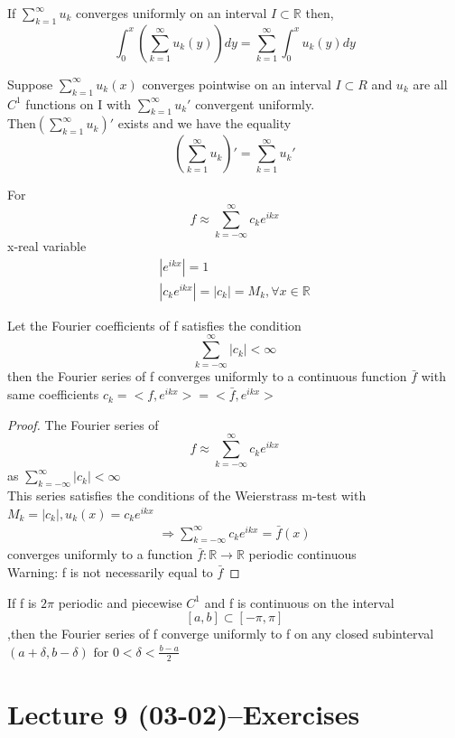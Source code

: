 \begin{proposition}[]{}
If $ \sum_{k=1}^{\infty}u_k $ converges uniformly on an interval $ I\subset \mathbb{R} $ then,$$
    \int_{0}^{x}(\sum_{k=1}^{\infty}u_k(y))dy=\sum_{k=1}^{\infty}\int_{0}^{x}u_k(y)dy
$$ 
\end{proposition}
\begin{proposition}[]{}
Suppose $\sum_{k=1}^{\infty}u_k(x)$ converges pointwise on an interval $I\subset R  $ and $ u_k $ are all $ C^1 $ functions on I with $ \sum_{k=1}^{\infty}u_k' $ convergent uniformly.
\\Then$ (\sum_{k=1}^{\infty}u_k)' $ exists and we have the equality $$
(\sum_{k=1}^{\infty}u_k)'=\sum_{k=1}^{\infty}u_k'
$$     
\end{proposition}
For$$
f \approx \sum_{k=-\infty}^{\infty}c_ke^{ikx}
$$ 
x-real variable
\begin{align*}{}{}
|e^{ikx}|=1\\
|c_ke^{ikx}|=|c_k| =M_k,\forall x\in\mathbb{R}
\end{align*}
\begin{theorem}[]{}
Let the Fourier coefficients of f satisfies the condition$$
  \sum_{k=-\infty}^{\infty}|c_k|<\infty
$$ then the Fourier series of f converges uniformly to a continuous function $ \bar{f} $ with same coefficients $ c_k=<f,e^{ikx}>=<\bar{f},e^{ikx}> $  
\end{theorem}
\begin{proof}
    The Fourier series of $$
        f\approx\sum_{k=-\infty}^{\infty}c_ke^{ikx}
    $$ as $\sum_{k=-\infty}^{\infty}|c_k|<\infty$
    \\This series satisfies the conditions of the Weierstrass m-test with $ M_k=|c_k| ,u_k(x)=c_ke^{ikx}$
    \begin{align*}{}{}
    \Rightarrow \sum_{k=-\infty}^{\infty}c_ke^{ikx}= \bar{f} (x)
    \end{align*}
    converges uniformly to a  function $ \bar{f}:\mathbb{R}\rightarrow\mathbb{R} $ periodic continuous
    \\Warning: f is not necessarily equal to $ \bar{f} $
\end{proof}
\begin{corollary}
    If f is $ 2\pi $  periodic and piecewise $ C^1 $  and f is continuous on the interval$$
       [a,b]\subset [-\pi,\pi]
    $$ ,then the Fourier series of f converge uniformly to f on any closed subinterval $(a+\delta,b-\delta) \text{ for }0<\delta<\frac{b-a}{2} $ 
\end{corollary}
\section{Lecture 9 (03-02)--Exercises}
